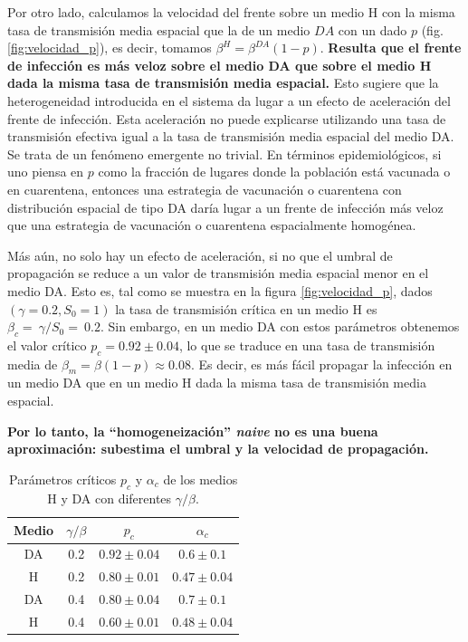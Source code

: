 Por otro lado, calculamos la velocidad del frente sobre un medio H con la misma tasa de transmisión media espacial que la de un medio $DA$ con un dado $p$ (fig. \ref{fig:velocidad_p}), es decir, tomamos $\beta^H = \beta ^{DA}(1-p)$. \textbf{Resulta que el frente de infección es más veloz sobre el medio DA que sobre el medio H dada la misma tasa de transmisión media espacial.} Esto sugiere que la heterogeneidad introducida en el sistema da lugar a un efecto de aceleración del frente de infección. Esta aceleración no puede explicarse utilizando una tasa de transmisión efectiva igual a la tasa de transmisión media espacial del medio DA. Se trata de un fenómeno emergente no trivial. En términos epidemiológicos, si uno piensa en $p$ como la fracción de lugares donde la población está vacunada o en cuarentena, entonces una estrategia de vacunación o cuarentena con distribución espacial de tipo DA daría lugar a un frente de infección más veloz que una estrategia de vacunación o cuarentena espacialmente homogénea.

Más aún, no solo hay un efecto de aceleración, si no que el umbral de propagación se reduce a un valor de transmisión media espacial menor en el medio DA. Esto es, tal como se muestra en la figura \ref{fig:velocidad_p}, dados $(\gamma=0.2,S_0=1)$ la tasa de transmisión crítica en un medio H es $\beta_c =~ \gamma/S_0=~0.2$. Sin embargo, en un medio DA con estos parámetros obtenemos el valor crítico $p_c = 0.92\pm 0.04$, lo que se traduce en una tasa de transmisión media de $\beta_m = \beta (1-p) \approx 0.08$. Es decir, es más fácil propagar la infección en un medio DA que en un medio H dada la misma tasa de transmisión media espacial.

\textbf{Por lo tanto, la ``homogeneización'' \textit{naive} no es una buena aproximación: subestima el umbral y la velocidad de propagación.}

\begin{table}[!b]
    \centering
    \caption{Parámetros críticos $p_c$ y $\alpha_c$ de los medios H y DA con diferentes $\gamma/\beta$.}
    \label{tab:param_criticos}
    \begin{tabular}{@{}cccc@{}}
    \toprule
    Medio & $\gamma/\beta$ & $p_c$         & $\alpha_c$    \\ \midrule
    DA    & 0.2            & $0.92\pm0.04$ & $0.6\pm0.1$ \\
    H     & 0.2            & $0.80\pm0.01$ & $0.47\pm0.04$ \\
    DA    & 0.4            & $0.80\pm0.04$ & $0.7\pm0.1$ \\
    H     & 0.4            & $0.60\pm0.01$ & $0.48\pm0.04$ \\ \bottomrule
    \end{tabular}
\end{table}



